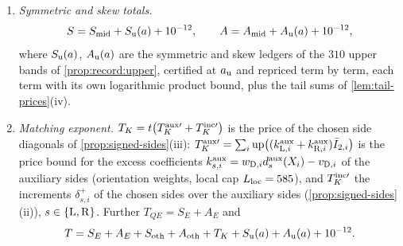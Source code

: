 \begin{definition}
\begin{enumerate}[label=(\arabic*)]
 $A_{F,i}=A^{\rm lead}_{F,i}+A^{\rm rem}_{F,i}$ and $S_{F,i}$; the same prices
 $A^{\rm arm}_{E,i}$, $A^{\rm lead}_{E,i}$, $A^{\rm rem}_{E,i}$, $A_{E,i}$, $S_{E,i}$
 of its two matching records; and the symmetric and skew prices $S_{{\rm oth},i}$,
 $A_{{\rm oth},i}$ of its other records (merges, deletions and the remaining
 changed records). They are formed from the completion weights
 $w_{{\rm D},i}$, $w_{{\rm S},i}$ (\cref{rem:middle-weights}), the charges
 $\bar I_{d,i}$, the endpoint coefficients $\ell_\tlaw(X_i)$, $a_F(X_i)$, $s_F(X_i)$
 of the signed fold records (\cref{prop:signed-bounds}), $a_E(X_i)$, $s_E(X_i)$,
 $r_E(X_i)$ of the matching records
 (\cref{lem:record:exact-marginal-e,lem:oct24:matching-star}) and the source coefficients for the generic rows $S_{{\rm oth},i},A_{{\rm oth},i}$, and rounded per piece on
 $10^{-30}\Z$; for instance
 $A^{\rm lead}_{F,i}=\operatorname{up}(2w_{{\rm D},i}\ell_\tlaw(X_i)\bar I_{2,i})$ and
 $A_{E,i}=2\operatorname{up}(w_{{\rm S},i}a_E(X_i)\bar I_{2,i})$. The totals at
 $a$ are $t$ times the sums over the pieces:
 $A^{\rm arm}_F=t\sum_iA^{\rm arm}_{F,i}$, and likewise $A^{\rm lead}_F$,
 $A^{\rm rem}_F$, $A_F$, $S_F$, $A^{\rm arm}_E$, $A^{\rm lead}_E$,
 $A^{\rm rem}_E$, $A_E$, $S_E$, $S_{\rm oth}$ and $A_{\rm oth}$; and
 $S_{\rm mid}=S_F+S_E+S_{\rm oth}$, $A_{\rm mid}=A_F+A_E+A_{\rm oth}$.
\item \emph{Symmetric and skew totals.}
 \[
  S=S_{\rm mid}+S_{\rm u}(a)+10^{-12},\qquad A=A_{\rm mid}+A_{\rm u}(a)+10^{-12},
 \]
 where $S_{\rm u}(a)$, $A_{\rm u}(a)$ are the symmetric and skew ledgers of the
 $310$ upper bands of \cref{prop:record:upper}, certified at $a_{\rm u}$ and
 repriced term by term, each term with its own logarithmic product bound, plus
 the tail sums of \cref{lem:tail-prices}(iv).
\item \emph{Matching exponent.} $T_K=t\bigl(T^{\rm aux\prime}_K+T^{\rm inc\prime}_K\bigr)$
 is the price of the chosen side diagonals of \cref{prop:signed-sides}(iii):
 $T^{\rm aux\prime}_K=\sum_i\operatorname{up}\bigl((k^{\rm aux}_{{\rm L},i}
 +k^{\rm aux}_{{\rm R},i})\bar I_{2,i}\bigr)$ is the price bound for the excess coefficients
 $k^{\rm aux}_{s,i}=w_{{\rm D},i}d^{\rm aux}_s(X_i)-v_{{\rm D},i}$ of the auxiliary
 sides (orientation weights, local cap $L_{\rm loc}=585$), and $T^{\rm inc\prime}_K$
 the increments $\delta^+_{s,i}$ of the chosen sides over the auxiliary sides (\cref{prop:signed-sides}(ii)), $s\in\{{\rm L},{\rm R}\}$.
 Further $T_{QE}=S_E+A_E$ and
 \[
  T=S_E+A_E+S_{\rm oth}+A_{\rm oth}+T_K+S_{\rm u}(a)+A_{\rm u}(a)+10^{-12}.
\]
\end{enumerate}
\end{definition}
